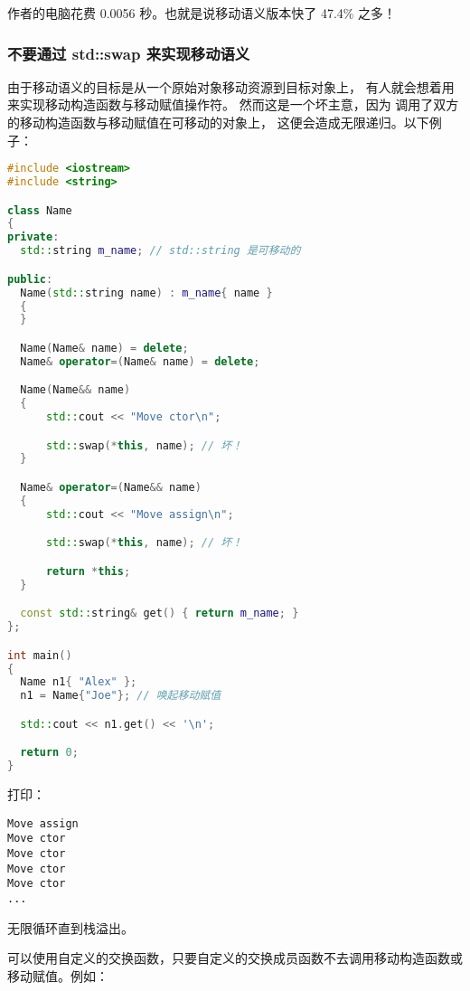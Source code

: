 \documentclass[../../LearnCpp.tex]{subfiles}
\begin{document}
作者的电脑花费 0.0056 秒。也就是说移动语义版本快了 47.4\% 之多！

\subsubsection*{不要通过 std::swap 来实现移动语义}

由于移动语义的目标是从一个原始对象移动资源到目标对象上，
有人就会想着用  来实现移动构造函数与移动赋值操作符。
然而这是一个坏主意，因为  调用了双方的移动构造函数与移动赋值在可移动的对象上，
这便会造成无限递归。以下例子：

\begin{lstlisting}[language=C++]
#include <iostream>
#include <string>

class Name
{
private:
  std::string m_name; // std::string 是可移动的

public:
  Name(std::string name) : m_name{ name }
  {
  }

  Name(Name& name) = delete;
  Name& operator=(Name& name) = delete;

  Name(Name&& name)
  {
      std::cout << "Move ctor\n";

      std::swap(*this, name); // 坏！
  }

  Name& operator=(Name&& name)
  {
      std::cout << "Move assign\n";

      std::swap(*this, name); // 坏！

      return *this;
  }

  const std::string& get() { return m_name; }
};

int main()
{
  Name n1{ "Alex" };
  n1 = Name{"Joe"}; // 唤起移动赋值

  std::cout << n1.get() << '\n';

  return 0;
}
\end{lstlisting}

打印：

\begin{lstlisting}
Move assign
Move ctor
Move ctor
Move ctor
Move ctor
...
\end{lstlisting}

无限循环直到栈溢出。

可以使用自定义的交换函数，只要自定义的交换成员函数不去调用移动构造函数或移动赋值。例如：
\end{document}
